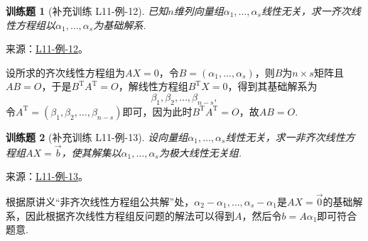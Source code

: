 \documentclass[UTF8,12pt,a4paper,fontset=fandol]{ctexart}
\newtheorem{exercise}{训练题}[section]
\begin{document}
\begin{exercise}[补充训练 L11-例-12]\label{prob:L11-例-12}
已知$n$维列向量组$\alpha_1,\ldots,\alpha_s$线性无关，求一齐次线性方程组以$\alpha_1,\ldots,\alpha_s$为基础解系.
\end{exercise}
\noindent 来源：\href{https://github.com/yhwu-is/Linear-Algebra-Left-Undone/blob/new/%E8%AE%B2%E4%B9%89/%E4%B8%93%E9%A2%98/11%20%E6%9C%9D%E8%8A%B1%E5%A4%95%E6%8B%BE.tex}{L11-例-12}。
\begin{solve}
设所求的齐次线性方程组为$AX=0$，令$B=(\alpha_1,\ldots,\alpha_s)$，则$B$为$n\times s$矩阵且$AB=O$，于是$B^\mathrm{T}A^\mathrm{T}=O$，解线性方程组$B^\mathrm{T}X=0$，得到其基础解系为
    \[\beta_1,\beta_2,\ldots,\beta_{n-s},\]
    令$A^\mathrm{T}=(\beta_1,\beta_2,\ldots,\beta_{n-s})$即可，因为此时$B^\mathrm{T}A^\mathrm{T}=O$，故$AB=O$.
\end{solve}

\begin{exercise}[补充训练 L11-例-13]\label{prob:L11-例-13}
设向量组$\alpha_1,\ldots,\alpha_s$线性无关，求一非齐次线性方程组$AX=\vec{b}$，使其解集以$\alpha_1,\ldots,\alpha_s$为极大线性无关组.
\end{exercise}
\noindent 来源：\href{https://github.com/yhwu-is/Linear-Algebra-Left-Undone/blob/new/%E8%AE%B2%E4%B9%89/%E4%B8%93%E9%A2%98/11%20%E6%9C%9D%E8%8A%B1%E5%A4%95%E6%8B%BE.tex}{L11-例-13}。
\begin{solve}
根据原讲义“非齐次线性方程组公共解”处，$\alpha_2-\alpha_1,\ldots,\alpha_s-\alpha_1$是$AX=\vec{0}$的基础解系，因此根据齐次线性方程组反问题的解法可以得到$A$，然后令$b=A\alpha_1$即可符合题意.
\end{solve}
\end{document}
